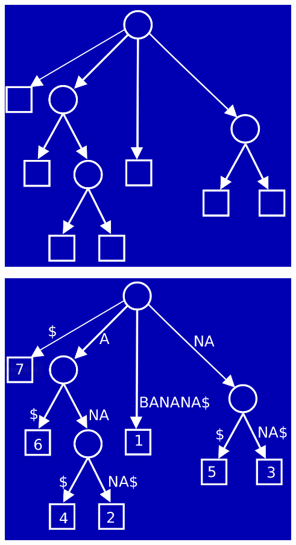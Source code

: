 \documentclass[a4paper,12pt, oneside]{book}
\begin{document}
\begin{center}
  \includegraphics[scale = 0.5]{img/suf5.png}
\end{center}
\begin{center}
  \includegraphics[scale = 0.5]{img/suf6.png}
\end{center}
\end{document}

